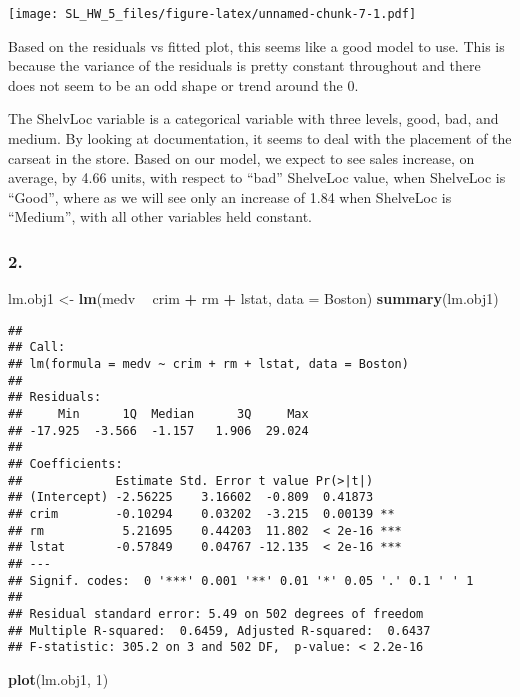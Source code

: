 \documentclass[]{article}
\newenvironment{Shaded}{\begin{snugshade}}{\end{snugshade}}
\newcommand{\DataTypeTok}[1]{\textcolor[rgb]{0.13,0.29,0.53}{#1}}
\newcommand{\DecValTok}[1]{\textcolor[rgb]{0.00,0.00,0.81}{#1}}
\newcommand{\KeywordTok}[1]{\textcolor[rgb]{0.13,0.29,0.53}{\textbf{#1}}}
\newcommand{\NormalTok}[1]{#1}
\newcommand{\OperatorTok}[1]{\textcolor[rgb]{0.81,0.36,0.00}{\textbf{#1}}}
\newcommand{\StringTok}[1]{\textcolor[rgb]{0.31,0.60,0.02}{#1}}
\begin{document}
\texttt{[image: SL\_HW\_5\_files/figure-latex/unnamed-chunk-7-1.pdf]}

Based on the residuals vs fitted plot, this seems like a good model to
use. This is because the variance of the residuals is pretty constant
throughout and there does not seem to be an odd shape or trend around
the 0.

The ShelvLoc variable is a categorical variable with three levels, good,
bad, and medium. By looking at documentation, it seems to deal with the
placement of the carseat in the store. Based on our model, we expect to
see sales increase, on average, by 4.66 units, with respect to ``bad''
ShelveLoc value, when ShelveLoc is ``Good'', where as we will see only
an increase of 1.84 when ShelveLoc is ``Medium'', with all other
variables held constant.

\hypertarget{section-4}{%
\subsubsection{2.}\label{section-4}}

\begin{Shaded}
\begin{Highlighting}[]
\NormalTok{lm.obj1 <-}\StringTok{ }\KeywordTok{lm}\NormalTok{(medv }\OperatorTok{~}\StringTok{ }\NormalTok{crim }\OperatorTok{+}\StringTok{ }\NormalTok{rm }\OperatorTok{+}\StringTok{ }\NormalTok{lstat, }\DataTypeTok{data =}\NormalTok{ Boston)}
\KeywordTok{summary}\NormalTok{(lm.obj1)}
\end{Highlighting}
\end{Shaded}

\begin{verbatim}
## 
## Call:
## lm(formula = medv ~ crim + rm + lstat, data = Boston)
## 
## Residuals:
##     Min      1Q  Median      3Q     Max 
## -17.925  -3.566  -1.157   1.906  29.024 
## 
## Coefficients:
##             Estimate Std. Error t value Pr(>|t|)    
## (Intercept) -2.56225    3.16602  -0.809  0.41873    
## crim        -0.10294    0.03202  -3.215  0.00139 ** 
## rm           5.21695    0.44203  11.802  < 2e-16 ***
## lstat       -0.57849    0.04767 -12.135  < 2e-16 ***
## ---
## Signif. codes:  0 '***' 0.001 '**' 0.01 '*' 0.05 '.' 0.1 ' ' 1
## 
## Residual standard error: 5.49 on 502 degrees of freedom
## Multiple R-squared:  0.6459, Adjusted R-squared:  0.6437 
## F-statistic: 305.2 on 3 and 502 DF,  p-value: < 2.2e-16
\end{verbatim}

\begin{Shaded}
\begin{Highlighting}[]
\KeywordTok{plot}\NormalTok{(lm.obj1, }\DecValTok{1}\NormalTok{)}
\end{Highlighting}
\end{Shaded}
\end{document}
